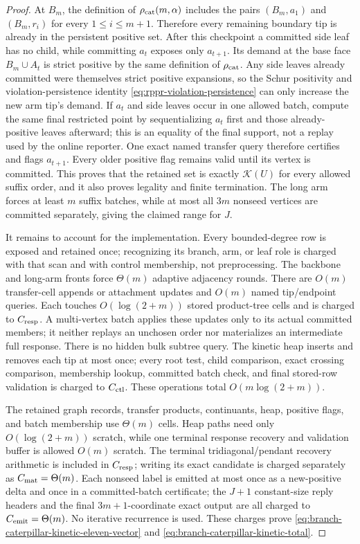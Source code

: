 \begin{proof}
At $B_m$, the definition of $\rho_{\rm cat}(m,\alpha)$ includes the pairs
$(B_m,a_1)$ and $(B_m,r_i)$ for every $1\leq i\leq m+1$.  Therefore every
remaining boundary tip is already in the persistent positive set.  After
this checkpoint a committed side leaf has no child, while committing $a_t$
exposes only $a_{t+1}$.  Its demand at the base face
$B_m\cup A_t$ is strict positive by the same definition of
$\rho_{\rm cat}$.  Any side leaves already committed were themselves strict
positive expansions, so the Schur positivity and violation-persistence
identity \eqref{eq:rppr-violation-persistence} can only increase the new arm
tip's demand.  If $a_t$ and side leaves occur in one allowed batch, compute the
same final restricted point by sequentializing $a_t$ first and those
already-positive leaves afterward; this is an equality of the final support,
not a replay used by the online reporter.  One exact named transfer query
therefore certifies and flags
$a_{t+1}$.  Every older positive flag remains valid until its vertex is
committed.  This proves that the retained set is exactly $\mathcal K(U)$ for
every allowed suffix order, and it also proves legality and finite
termination.  The long arm forces at least $m$ suffix batches, while at most
all $3m$ nonseed vertices are committed separately, giving the claimed range
for $J$.

It remains to account for the implementation.  Every bounded-degree row is
exposed and retained once; recognizing its branch, arm, or leaf role is
charged with that scan and with control membership, not preprocessing.  The
backbone and long-arm fronts force $\Theta(m)$ adaptive adjacency rounds.
There are $O(m)$ transfer-cell appends or attachment updates and $O(m)$ named
tip/endpoint queries.  Each touches $O(\log(2+m))$ stored product-tree cells
and is charged to $C_{\rm resp}$.  A multi-vertex batch applies these updates
only to its actual committed members; it neither replays an unchosen order nor
materializes an intermediate full response.  There is no hidden bulk subtree
query.
The kinetic heap inserts and removes each tip at most once; every root test,
child comparison, exact crossing comparison, membership lookup, committed
batch check, and final stored-row validation is charged to $C_{\rm ctl}$.
These operations total $O(m\log(2+m))$.

The retained graph records, transfer products, continuants, heap, positive
flags, and batch membership use $\Theta(m)$ cells.  Heap paths need only
$O(\log(2+m))$ scratch, while one terminal response recovery and validation
buffer is allowed $O(m)$ scratch.  The terminal tridiagonal/pendant recovery
arithmetic is included in $C_{\rm resp}$; writing its exact candidate is
charged separately as $C_{\rm mat}=\Theta(m)$.  Each nonseed label is emitted
at most once as a new-positive delta and once in a committed-batch
certificate; the $J+1$ constant-size reply headers and the final
$3m+1$-coordinate exact output are all charged to
$C_{\rm emit}=\Theta(m)$.  No iterative recurrence is used.  These charges
prove \eqref{eq:branch-caterpillar-kinetic-eleven-vector} and
\eqref{eq:branch-caterpillar-kinetic-total}.
\end{proof}

